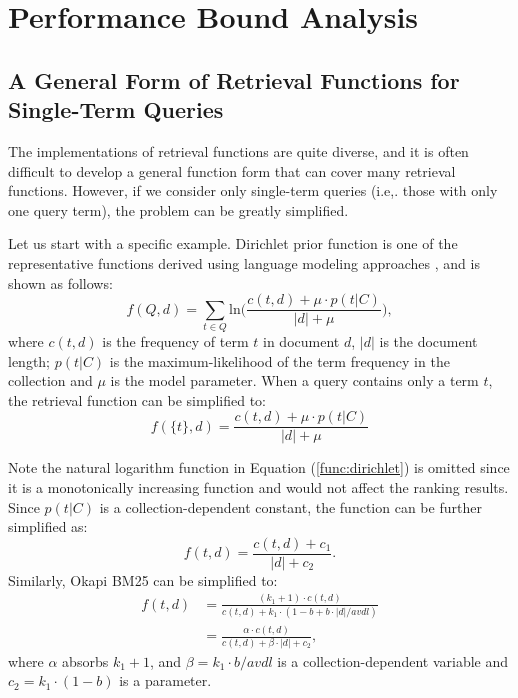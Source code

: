\section{Performance Bound Analysis}
\label{sec:stqa}

\subsection{A General Form of Retrieval Functions for Single-Term Queries}

The implementations of retrieval functions are quite diverse, and it 
is often difficult to develop a general function form that can cover
many retrieval functions. However, if we consider only single-term 
queries (i.e,. those with only one query term), the problem can 
be greatly simplified. 

Let us start with a specific example. Dirichlet prior function 
is one of the representative functions derived using language 
modeling approaches \cite{Zhai:2004:SSM:984321.984322}, and 
is shown as follows: 
\begin{equation}
\label{func:dirichlet}
f(Q,d)=\sum_{t \in Q}{\mathrm{ln}\Bigg(\frac{c(t, d)+\mu \cdot p(t|C)}{|d|+\mu}\Bigg)}, 
\end{equation}
where $c(t,d)$ is the frequency of term $t$ in document $d$, 
$|d|$ is the document length; $p(t|C)$ is the maximum-likelihood of the term 
frequency in the collection and $\mu$ is the model parameter.  
When a query contains only a term $t$, the retrieval function can 
be simplified to: 
\begin{equation}
\label{func:dirsimple}
f(\{t\},d)=\frac{c(t, d)+\mu \cdot p(t|C)}{|d|+\mu}
\end{equation}

Note the natural logarithm function in Equation (\ref{func:dirichlet}) 
is omitted since it is a monotonically increasing function and would not affect the 
ranking results. Since $p(t|C)$ is a collection-dependent constant, the function 
can be further simplified as: 
\begin{equation}
\label{func:dirsimplef}
f(t,d) = \frac{c(t, d)+c_1}{|d|+c_2}. 
\end{equation}
Similarly, Okapi BM25 \cite{Robertson96okapiat3} can be simplified to: 
\begin{equation}
\label{func:bm25simple}
\begin{split}
f(t,d) & =\frac{(k_1+1) \cdot c(t, d)}{c(t, d)+k_1 \cdot (1-b+b \cdot |d|/avdl)} \\
& = \frac{\alpha \cdot c(t, d)}{c(t, d)+\beta \cdot |d| + c_2}, 
\end{split}
\end{equation}
where $\alpha$ absorbs $k_1+1$, and $\beta=k_1\cdot b/avdl$ is a collection-dependent 
variable and $c_2=k_1 \cdot (1-b)$ is a parameter.

